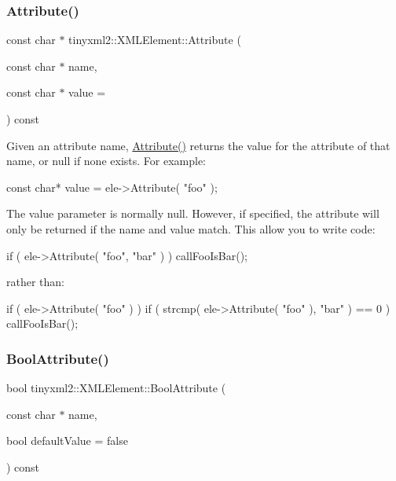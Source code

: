 \subsubsection{\texorpdfstring{Attribute()}{Attribute()}}
{\footnotesize\ttfamily const char $\ast$ tinyxml2\+::\+X\+M\+L\+Element\+::\+Attribute (\begin{DoxyParamCaption}\item[{const char $\ast$}]{name,  }\item[{const char $\ast$}]{value = {} }\end{DoxyParamCaption}) const}

Given an attribute name, \hyperlink{classtinyxml2_1_1_x_m_l_element_a48cf4a315cfbac7d74cd0d5ff2c5df51}{Attribute()} returns the value for the attribute of that name, or null if none exists. For example\+:

\begin{DoxyVerb}const char* value = ele->Attribute( "foo" );
\end{DoxyVerb}


The \textquotesingle{}value\textquotesingle{} parameter is normally null. However, if specified, the attribute will only be returned if the \textquotesingle{}name\textquotesingle{} and \textquotesingle{}value\textquotesingle{} match. This allow you to write code\+:

\begin{DoxyVerb}if ( ele->Attribute( "foo", "bar" ) ) callFooIsBar();
\end{DoxyVerb}


rather than\+: \begin{DoxyVerb}if ( ele->Attribute( "foo" ) ) {
if ( strcmp( ele->Attribute( "foo" ), "bar" ) == 0 ) callFooIsBar();
}
\end{DoxyVerb}
 \mbox{\label{classtinyxml2_1_1_x_m_l_element_a53eda26131e1ad1031ef8ec8adb51bd8}} 
\subsubsection{\texorpdfstring{Bool\+Attribute()}{BoolAttribute()}}
{\footnotesize\ttfamily bool tinyxml2\+::\+X\+M\+L\+Element\+::\+Bool\+Attribute (\begin{DoxyParamCaption}\item[{const char $\ast$}]{name,  }\item[{bool}]{default\+Value = {\ttfamily false} }\end{DoxyParamCaption}) const}



